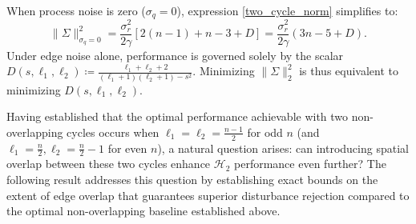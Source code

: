 When process noise is zero ($\sigma_q = 0$), expression \eqref{two_cycle_norm} simplifies to:
\begin{equation}\label{eq:ch_RA_norm_edge_noise_only}
	\|\Sigma\|_{\sigma_q=0}^2 = \frac{\sigma_r^2}{2\gamma} \left[ 2(n-1) + n - 3 + D \right] = \frac{\sigma_r^2}{2\gamma} \left( 3n - 5 + D \right).
\end{equation}
Under edge noise alone, performance is governed solely by the scalar $D(s, \ell_1, \ell_2) \coloneqq \frac{\ell_1 + \ell_2 + 2}{(\ell_1+1)(\ell_2+1) - s^2}$. Minimizing $\|\Sigma\|_2^2$ is thus equivalent to minimizing $D(s, \ell_1, \ell_2)$.

Having established that the optimal performance achievable with two non-overlapping cycles occurs when $\ell_1 = \ell_2 = \frac{n-1}{2}$ for odd $n$ (and $\ell_1 = \frac{n}{2}, \ell_2 = \frac{n}{2}-1$ for even $n$), a natural question arises: can introducing spatial overlap between these two cycles enhance $\mathcal{H}_2$ performance even further? The following result addresses this question by establishing exact bounds on the extent of edge overlap that guarantees superior disturbance rejection compared to the optimal non-overlapping baseline established above.
